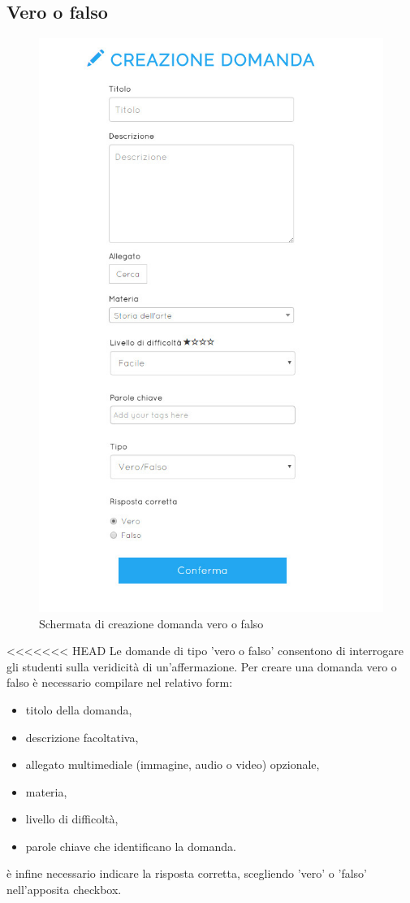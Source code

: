 \documentclass[a4paper, titlepage]{article}
\begin{document}
	 \subsection{Vero o falso}
	 \begin{figure}[!h]
 	 	\centering
 	 	\includegraphics[scale=0.33]{Img/screen_CreazioneDomandaVF.png}
 	 	\caption{Schermata di creazione domanda vero o falso}
	 \end{figure}
<<<<<<< HEAD
	 Le domande di tipo 'vero o falso' consentono di interrogare gli studenti sulla veridicità di un'affermazione. 
	 Per creare una domanda vero o falso è necessario compilare nel relativo form:
	 \begin{itemize}
 	 	\item titolo della domanda,
 	 	\item descrizione facoltativa,
 	 	\item allegato multimediale (immagine, audio o video) opzionale,
 	 	\item materia,
 	 	\item livello di difficoltà,
 	 	\item parole chiave che identificano la domanda.
	 \end{itemize}
	 è infine necessario indicare la risposta corretta, scegliendo 'vero' o 'falso' nell'apposita checkbox.
\end{document}
